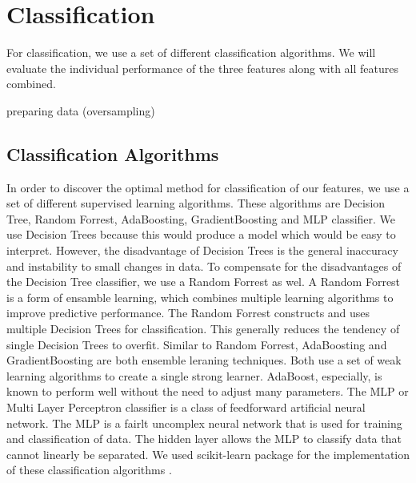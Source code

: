 \section{Classification}

For classification, we use a set of different classification algorithms. We will evaluate the individual performance of the three features along with all features combined.

preparing data (oversampling)

\subsection{Classification Algorithms}
In order to discover the optimal method for classification of our features, we use a set of different supervised learning algorithms. These algorithms are Decision Tree, Random Forrest, AdaBoosting, GradientBoosting and MLP classifier. We use Decision Trees because this would produce a model which would be easy to interpret. However, the disadvantage of Decision Trees is the general inaccuracy and instability to small changes in data. To compensate for the disadvantages of the Decision Tree classifier, we use a Random Forrest as wel. A Random Forrest is a form of ensamble learning, which combines multiple learning algorithms to improve predictive performance. The Random Forrest constructs and uses multiple Decision Trees for classification. This generally reduces the tendency of single Decision Trees to overfit. Similar to Random Forrest, AdaBoosting and GradientBoosting are both ensemble leraning techniques. Both use a set of weak learning algorithms to create a single strong learner. AdaBoost, especially, is known to perform well without the need to adjust many parameters. The MLP  or Multi Layer Perceptron classifier is a class of feedforward artificial neural network. The MLP is a fairlt uncomplex neural network that is used for training and classification of data. The hidden layer allows the MLP to classify data that cannot linearly be separated. We used scikit-learn package for the implementation of these classification algorithms \cite{scikit-learn}.

